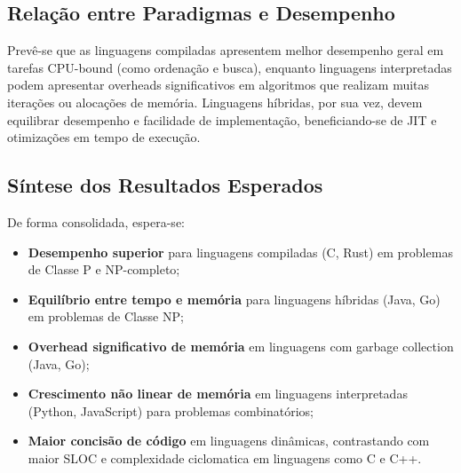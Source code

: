 \documentclass[12pt, a4paper]{article}
\begin{document}
\subsection{Relação entre Paradigmas e Desempenho}

Prevê-se que as linguagens compiladas apresentem melhor desempenho geral em tarefas CPU-bound (como ordenação e busca), enquanto linguagens interpretadas podem apresentar overheads significativos em algoritmos que realizam muitas iterações ou alocações de memória. Linguagens híbridas, por sua vez, devem equilibrar desempenho e facilidade de implementação, beneficiando-se de JIT e otimizações em tempo de execução.

\subsection{Síntese dos Resultados Esperados}

De forma consolidada, espera-se:

\begin{itemize}
    \item \textbf{Desempenho superior} para linguagens compiladas (C, Rust) em problemas de Classe P e NP-completo;
    \item \textbf{Equilíbrio entre tempo e memória} para linguagens híbridas (Java, Go) em problemas de Classe NP;
    \item \textbf{Overhead significativo de memória} em linguagens com garbage collection (Java, Go);
    \item \textbf{Crescimento não linear de memória} em linguagens interpretadas (Python, JavaScript) para problemas combinatórios;
    \item \textbf{Maior concisão de código} em linguagens dinâmicas, contrastando com maior SLOC e complexidade ciclomatica em linguagens como C e C++.
\end{itemize}



\end{document}
